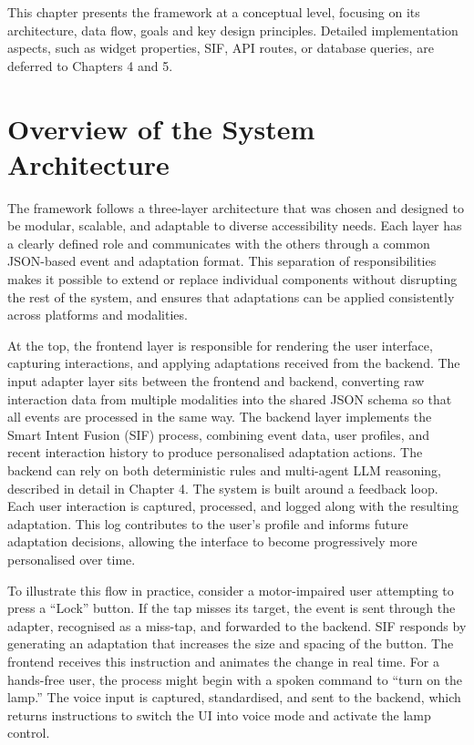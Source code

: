 \documentclass[openany]{book}
\begin{document}
This chapter presents the framework at a conceptual level, focusing on its architecture, data flow, goals and key design principles. Detailed implementation aspects, such as widget properties, SIF, API routes, or database queries, are deferred to Chapters 4 and 5.

\section{Overview of the System Architecture}
The framework follows a three-layer architecture that was chosen and designed to be modular, scalable, and adaptable to diverse accessibility needs. Each layer has a clearly defined role and communicates with the others through a common JSON-based event and adaptation format. This separation of responsibilities makes it possible to extend or replace individual components without disrupting the rest of the system, and ensures that adaptations can be applied consistently across platforms and modalities.

At the top, the frontend layer is responsible for rendering the user interface, capturing interactions, and applying adaptations received from the backend. The input adapter layer sits between the frontend and backend, converting raw interaction data from multiple modalities into the shared JSON schema so that all events are processed in the same way. The backend layer implements the Smart Intent Fusion (SIF) process, combining event data, user profiles, and recent interaction history to produce personalised adaptation actions. The backend can rely on both deterministic rules and multi-agent LLM reasoning, described in detail in Chapter 4. 
The system is built around a feedback loop. Each user interaction is captured, processed, and logged along with the resulting adaptation. This log contributes to the user’s profile and informs future adaptation decisions, allowing the interface to become progressively more personalised over time.

To illustrate this flow in practice, consider a motor-impaired user attempting to press a “Lock” button. If the tap misses its target, the event is sent through the adapter, recognised as a miss-tap, and forwarded to the backend. SIF responds by generating an adaptation that increases the size and spacing of the button. The frontend receives this instruction and animates the change in real time. For a hands-free user, the process might begin with a spoken command to “turn on the lamp.” The voice input is captured, standardised, and sent to the backend, which returns instructions to switch the UI into voice mode and activate the lamp control.
\end{document}
